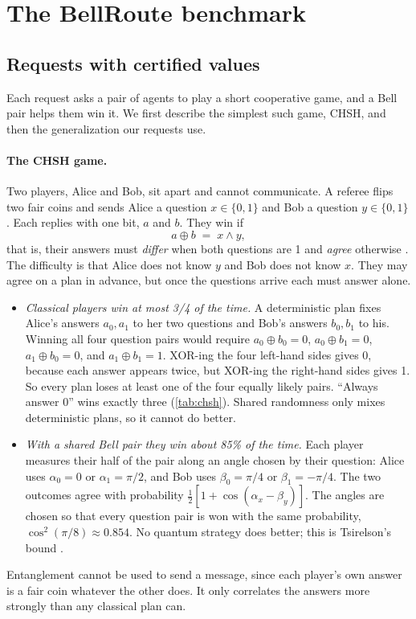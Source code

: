 \documentclass[10pt]{article}
\newcommand{\xor}{\mathbin{\oplus}}
\newcommand{\bellroute}{BellRoute}
\begin{document}
\section{The \bellroute{} benchmark}\label{sec:benchmark}

\subsection{Requests with certified values}\label{sec:requests}

Each request asks a pair of agents to play a short cooperative game, and a Bell pair helps them win it. We first describe the simplest such game, CHSH, and then the generalization our requests use.

\paragraph{The CHSH game.} Two players, Alice and Bob, sit apart and cannot communicate. A referee flips two fair coins and sends Alice a question $x\in\{0,1\}$ and Bob a question $y\in\{0,1\}$. Each replies with one bit, $a$ and $b$. They win if
\begin{equation}
  a\xor b \;=\; x\wedge y ,
  \label{eq:chsh}
\end{equation}
that is, their answers must \emph{differ} when both questions are 1 and \emph{agree} otherwise \citep{clauser1969proposed}. The difficulty is that Alice does not know $y$ and Bob does not know $x$. They may agree on a plan in advance, but once the questions arrive each must answer alone.
\begin{itemize}[leftmargin=*]
  \item \emph{Classical players win at most 3/4 of the time.} A deterministic plan fixes Alice's answers $a_0,a_1$ to her two questions and Bob's answers $b_0,b_1$ to his. Winning all four question pairs would require $a_0\xor b_0=0$, $a_0\xor b_1=0$, $a_1\xor b_0=0$, and $a_1\xor b_1=1$. XOR-ing the four left-hand sides gives 0, because each answer appears twice, but XOR-ing the right-hand sides gives 1. So every plan loses at least one of the four equally likely pairs. ``Always answer 0'' wins exactly three (\cref{tab:chsh}). Shared randomness only mixes deterministic plans, so it cannot do better.
  \item \emph{With a shared Bell pair they win about 85\% of the time.} Each player measures their half of the pair along an angle chosen by their question: Alice uses $\alpha_0=0$ or $\alpha_1=\pi/2$, and Bob uses $\beta_0=\pi/4$ or $\beta_1=-\pi/4$. The two outcomes agree with probability $\tfrac12[1+\cos(\alpha_x-\beta_y)]$. The angles are chosen so that every question pair is won with the same probability, $\cos^2(\pi/8)\approx0.854$. No quantum strategy does better; this is Tsirelson's bound \citep{tsirelson1980quantum}.
\end{itemize}
Entanglement cannot be used to send a message, since each player's own answer is a fair coin whatever the other does. It only correlates the answers more strongly than any classical plan can.
\end{document}
